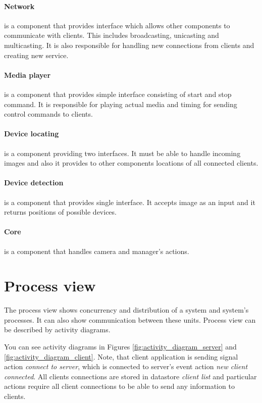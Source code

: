 \paragraph{Network} is a component that provides interface which allows other components to communicate with clients. 
This includes broadcasting, unicasting and multicasting. 
It is also responsible for handling new connections from clients and creating new service.

\paragraph{Media player} is a component that provides simple interface consisting of start and stop command. 
It is responsible for playing actual media and timing for sending control commands to clients.

\paragraph{Device locating} is a component providing two interfaces. 
It must be able to handle incoming images and also it provides to other components locations of all connected clients.

\paragraph{Device detection} is a component that provides single interface. 
It accepts image as an input and it returns positions of possible devices.

\paragraph{Core} is a component that handles camera and manager's actions.


\section{Process view}
The process view shows concurrency and distribution of a system and system's processes.
It can also show communication between these units.
Process view can be described by activity diagrams.

You can see activity diagrams in Figures \ref{fig:activity_diagram_server} and \ref{fig:activity_diagram_client}. Note, that client application is sending signal action \emph{connect to server}, which is connected to server's event action \emph{new client connected}. 
 All clients connections are stored in datastore \emph{client list} and particular actions require all client connections to be able to send any information to clients.

